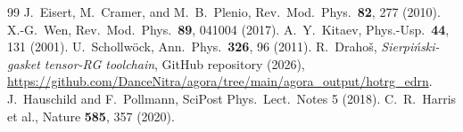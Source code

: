 \documentclass[aps,prb,reprint,superscriptaddress]{revtex4-2}
\begin{document}
\begin{thebibliography}{99}
 J.~Eisert, M.~Cramer, and M.~B.~Plenio, Rev.\ Mod.\ Phys.\ \textbf{82}, 277 (2010).
 X.-G.~Wen, Rev.\ Mod.\ Phys.\ \textbf{89}, 041004 (2017).
 A.~Y.~Kitaev, Phys.-Usp.\ \textbf{44}, 131 (2001).
 U.~Schollw\"{o}ck, Ann.\ Phys.\ \textbf{326}, 96 (2011).
 R.~Draho\v{s}, \emph{Sierpi\'{n}ski-gasket tensor-RG toolchain}, GitHub repository (2026), \url{https://github.com/DanceNitra/agora/tree/main/agora_output/hotrg_edrn}.
 J.~Hauschild and F.~Pollmann, SciPost Phys.\ Lect.\ Notes 5 (2018).
 C.~R.~Harris et al., Nature \textbf{585}, 357 (2020).
\end{thebibliography}
\end{document}
